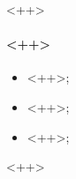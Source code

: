 
\begin{frame}{<++>}
	\framesubtitle{<++>}
	\begin{itemize}[itemsep = 0.1cm]
		\item<1->{<++>};
		\item<1->{<++>};
		\item<1->{<++>};
	\end{itemize}
\end{frame}
<++>

